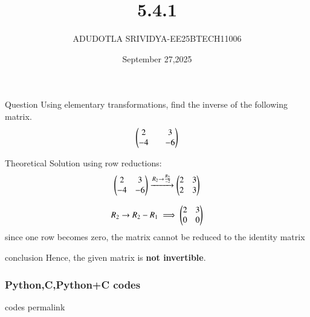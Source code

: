 \documentclass{beamer}
\title{5.4.1}
\date{September 27,2025}
\author{ADUDOTLA SRIVIDYA-EE25BTECH11006}
\begin{document}
\frame{\titlepage}

\begin{frame}{Question}
Using elementary transformations, find the inverse of the following matrix. 
\begin{align*}
    \begin{pmatrix}2&&3\\-4&&-6\end{pmatrix}
\end{align*}
\end{frame}

\begin{frame}{Theoretical Solution}
using row reductions:
\begin{align}
    \begin{pmatrix}2&3\\-4&-6\end{pmatrix} 
    \xrightarrow[]{R_2 \rightarrow \frac{R_2}{-2}} 
    \begin{pmatrix}2&3\\2&3\end{pmatrix}
\end{align}

\begin{align}
    R_2 \rightarrow R_2 - R_1 \implies \begin{pmatrix}2&3 \\ 0&0\end{pmatrix}
\end{align}
since one row becomes zero, the matrix cannot be reduced to the identity matrix
\end{frame}

\begin{frame}{conclusion}
Hence, the given matrix is \textbf{not invertible}. 
\end{frame}


\begin{frame}[fragile]
\frametitle{Python,C,Python+C codes}
codes permalink
\end{frame}
\end{document}
